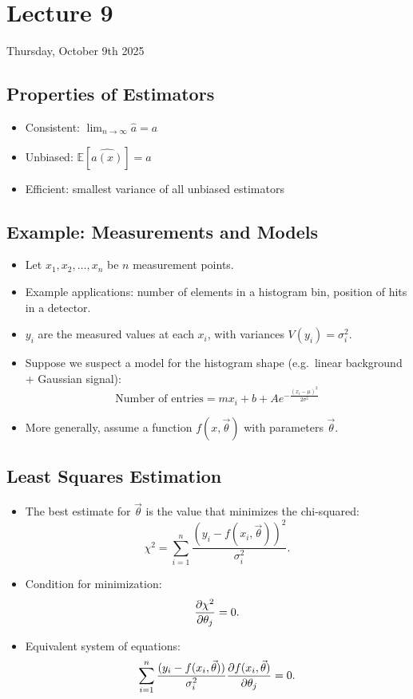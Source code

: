 \section{Lecture 9}

Thursday, October 9th 2025

\subsection{Properties of Estimators}
\begin{itemize}
    \item Consistent: $\lim_{n \rightarrow \infty} \hat{a} = a$
    \item Unbiased: $\mathbb{E}[\hat{a(x)}] = a$
    \item Efficient: smallest variance of all unbiased estimators
\end{itemize}

\subsection{Example: Measurements and Models}
\begin{itemize}
    \item Let $x_1, x_2, \ldots, x_n$ be $n$ measurement points.
    \item Example applications: number of elements in a histogram bin, position of hits in a detector.
    \item $y_i$ are the measured values at each $x_i$, with variances $V(y_i) = \sigma_i^2$.
    \item Suppose we suspect a model for the histogram shape (e.g.\ linear background $+$ Gaussian signal):
          \[
              \text{Number of entries} = m x_i + b + A e^{-\frac{(x_i - \mu)^2}{2\sigma^2}}
          \]
    \item More generally, assume a function $f(x, \vec{\theta})$ with parameters $\vec{\theta}$.
\end{itemize}

\subsection{Least Squares Estimation}
\begin{itemize}
    \item The best estimate for $\vec{\theta}$ is the value that minimizes the chi-squared:
          \[
              \chi^2 = \sum_{i=1}^{n} \frac{(y_i - f(x_i, \vec{\theta}))^2}{\sigma_i^2}.
          \]
    \item Condition for minimization:
          \[
              \pdv{\chi^2}{\theta_j} = 0.
          \]
    \item Equivalent system of equations:
          \[
              \sum_{i=1}^{n} \frac{(y_i - f(x_i, \vec{\theta}))}{\sigma_i^2}
              \pdv{f(x_i, \vec{\theta})}{\theta_j} = 0.
          \]
\end{itemize}


